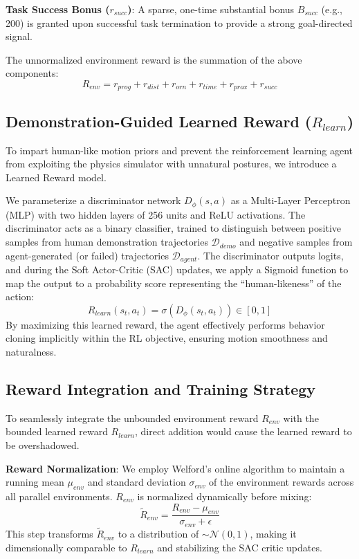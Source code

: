 \documentclass[conference]{IEEEtran}
\begin{document}
\textbf{Task Success Bonus ($r_{succ}$)}: A sparse, one-time substantial bonus $B_{succ}$ (e.g., 200) is granted upon successful task termination to provide a strong goal-directed signal.

The unnormalized environment reward is the summation of the above components:
$$R_{env} = r_{prog} + r_{dist} + r_{orn} + r_{time} + r_{prox} + r_{succ}$$

\subsection{Demonstration-Guided Learned Reward ($R_{learn}$)}
To impart human-like motion priors and prevent the reinforcement learning agent from exploiting the physics simulator with unnatural postures, we introduce a Learned Reward model.

We parameterize a discriminator network $D_\phi(s, a)$ as a Multi-Layer Perceptron (MLP) with two hidden layers of 256 units and ReLU activations. The discriminator acts as a binary classifier, trained to distinguish between positive samples from human demonstration trajectories $\mathcal{D}_{demo}$ and negative samples from agent-generated (or failed) trajectories $\mathcal{D}_{agent}$. The discriminator outputs logits, and during the Soft Actor-Critic (SAC) updates, we apply a Sigmoid function to map the output to a probability score representing the ``human-likeness'' of the action:
$$R_{learn}(s_t, a_t) = \sigma(D_\phi(s_t, a_t)) \in [0, 1]$$
By maximizing this learned reward, the agent effectively performs behavior cloning implicitly within the RL objective, ensuring motion smoothness and naturalness.

\subsection{Reward Integration and Training Strategy}
To seamlessly integrate the unbounded environment reward $R_{env}$ with the bounded learned reward $R_{learn}$, direct addition would cause the learned reward to be overshadowed.

\textbf{Reward Normalization}: We employ Welford's online algorithm to maintain a running mean $\mu_{env}$ and standard deviation $\sigma_{env}$ of the environment rewards across all parallel environments. $R_{env}$ is normalized dynamically before mixing:
$$\tilde{R}_{env} = \frac{R_{env} - \mu_{env}}{\sigma_{env} + \epsilon}$$
This step transforms $\tilde{R}_{env}$ to a distribution of $\sim \mathcal{N}(0,1)$, making it dimensionally comparable to $R_{learn}$ and stabilizing the SAC critic updates.
\end{document}
